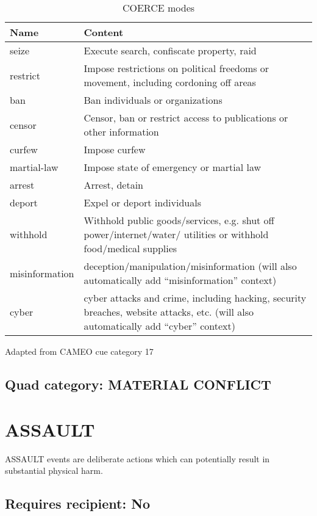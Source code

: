\documentclass[11pt]{report}
\newcommand{\plcat}[1]{\textsf{#1}}
\begin{document}
\begin{table}[htp]
\caption{COERCE modes}
\begin{center}
\begin{tabular}{|p{}|L{.73\textwidth}|}
\hline
Name & Content \\
\hline
seize & Execute search, confiscate property, raid \\
restrict & Impose restrictions on political freedoms or movement, including cordoning off areas \\
ban & Ban individuals or organizations \\
censor & Censor, ban or restrict access to publications or other information  \\
curfew & Impose curfew \\
martial-law & Impose state of emergency or martial law \\
arrest & Arrest, detain  \\
deport & Expel or deport individuals \\
withhold & Withhold public goods/services, e.g. shut off power/internet/water/ utilities or withhold food/medical supplies \\
misinformation & deception/manipulation/misinformation (will also automatically add ``misinformation'' context) \\
cyber & cyber attacks and crime, including hacking, security breaches, website attacks, etc. (will also automatically add ``cyber'' context) \\
\hline
\end{tabular}
\end{center}
\label{tab:coerce}
Adapted from CAMEO cue category 17
\end{table}%


\subsection{Quad category: MATERIAL CONFLICT}

\newpage


\section{ASSAULT}

\plcat{ASSAULT} events are deliberate actions which can potentially result in substantial physical harm.

\subsection{Requires recipient: No}
\end{document}
